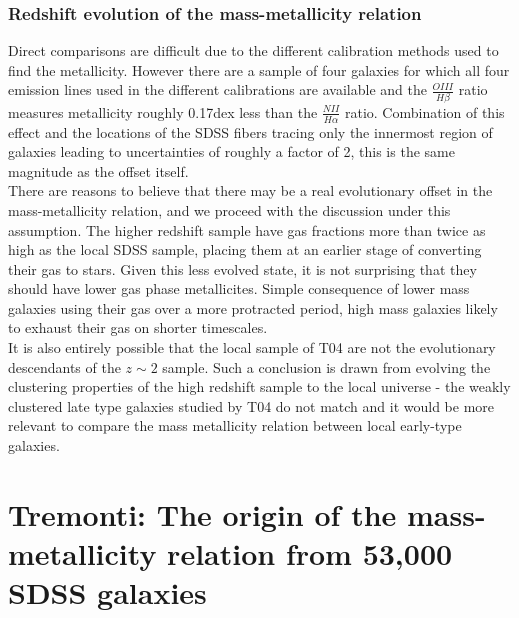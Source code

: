 \documentclass{literature}
\begin{document}
\subsubsection{Redshift evolution of the mass-metallicity relation}
Direct comparisons are difficult due to the different calibration methods used to find the metallicity. However there are a sample of four galaxies for which all four emission lines used in the different calibrations are available and the $\frac{OIII}{H\beta}$ ratio measures metallicity roughly 0.17dex less than the $\frac{NII}{H\alpha} $ ratio. Combination of this effect and the locations of the SDSS fibers tracing only the innermost region of galaxies leading to uncertainties of roughly a factor of 2, this is the same magnitude as the offset itself. \\ 
There are reasons to believe that there may be a real evolutionary offset in the mass-metallicity relation, and we proceed with the discussion under this assumption. The higher redshift sample have gas fractions more than twice as high as the local SDSS sample, placing them at an earlier stage of converting their gas to stars. Given this less evolved state, it is not surprising that they should have lower gas phase metallicites. Simple consequence of lower mass galaxies using their gas over a more protracted period, high mass galaxies likely to exhaust their gas on shorter timescales. \\ 
It is also entirely possible that the local sample of T04 are not the evolutionary descendants of the $z \sim 2$ sample. Such a conclusion is drawn from evolving the clustering properties of the high redshift sample to the local universe - the weakly clustered late type galaxies studied by T04 do not match and it would be more relevant to compare the mass metallicity relation between local early-type galaxies. 
 

\section{Tremonti: The origin of the mass-metallicity relation from 53,000 SDSS galaxies}\label{sec:tremonti_2004}
\end{document}
